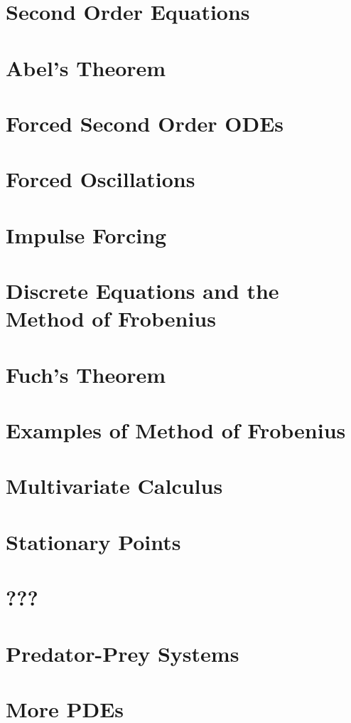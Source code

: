 \documentclass{article}
\begin{document}
\section{Second Order Equations}

\section{Abel's Theorem}

\section{Forced Second Order ODEs}

\section{Forced Oscillations}

\section{Impulse Forcing}

\section{Discrete Equations and the Method of Frobenius}

\section{Fuch's Theorem}

\section{Examples of Method of Frobenius}

\section{Multivariate Calculus}

\section{Stationary Points}

\section{???}

\section{Predator-Prey Systems}

\section{More PDEs}

\end{document}
